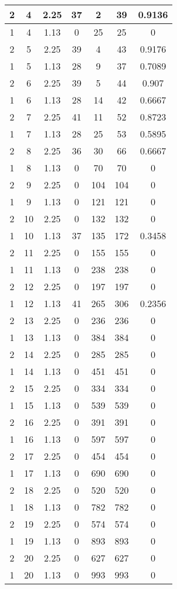 \documentclass[letterpaper, 12pt]{article}
\begin{document}
\begin{longtable}{|c|c|c|c|c|c|c|}
\hline
2 & 4 & 2.25 & 37 & 2 & 39 & 0.9136 \\
\hline
1 & 4 & 1.13 & 0 & 25 & 25 & 0 \\
\hline
2 & 5 & 2.25 & 39 & 4 & 43 & 0.9176 \\
\hline
1 & 5 & 1.13 & 28 & 9 & 37 & 0.7089 \\
\hline
2 & 6 & 2.25 & 39 & 5 & 44 & 0.907 \\
\hline
1 & 6 & 1.13 & 28 & 14 & 42 & 0.6667 \\
\hline
2 & 7 & 2.25 & 41 & 11 & 52 & 0.8723 \\
\hline
1 & 7 & 1.13 & 28 & 25 & 53 & 0.5895 \\
\hline
2 & 8 & 2.25 & 36 & 30 & 66 & 0.6667 \\
\hline
1 & 8 & 1.13 & 0 & 70 & 70 & 0 \\
\hline
2 & 9 & 2.25 & 0 & 104 & 104 & 0 \\
\hline
1 & 9 & 1.13 & 0 & 121 & 121 & 0 \\
\hline
2 & 10 & 2.25 & 0 & 132 & 132 & 0 \\
\hline
1 & 10 & 1.13 & 37 & 135 & 172 & 0.3458 \\
\hline
2 & 11 & 2.25 & 0 & 155 & 155 & 0 \\
\hline
1 & 11 & 1.13 & 0 & 238 & 238 & 0 \\
\hline
2 & 12 & 2.25 & 0 & 197 & 197 & 0 \\
\hline
1 & 12 & 1.13 & 41 & 265 & 306 & 0.2356 \\
\hline
2 & 13 & 2.25 & 0 & 236 & 236 & 0 \\
\hline
1 & 13 & 1.13 & 0 & 384 & 384 & 0 \\
\hline
2 & 14 & 2.25 & 0 & 285 & 285 & 0 \\
\hline
1 & 14 & 1.13 & 0 & 451 & 451 & 0 \\
\hline
2 & 15 & 2.25 & 0 & 334 & 334 & 0 \\
\hline
1 & 15 & 1.13 & 0 & 539 & 539 & 0 \\
\hline
2 & 16 & 2.25 & 0 & 391 & 391 & 0 \\
\hline
1 & 16 & 1.13 & 0 & 597 & 597 & 0 \\
\hline
2 & 17 & 2.25 & 0 & 454 & 454 & 0 \\
\hline
1 & 17 & 1.13 & 0 & 690 & 690 & 0 \\
\hline
2 & 18 & 2.25 & 0 & 520 & 520 & 0 \\
\hline
1 & 18 & 1.13 & 0 & 782 & 782 & 0 \\
\hline
2 & 19 & 2.25 & 0 & 574 & 574 & 0 \\
\hline
1 & 19 & 1.13 & 0 & 893 & 893 & 0 \\
\hline
2 & 20 & 2.25 & 0 & 627 & 627 & 0 \\
\hline
1 & 20 & 1.13 & 0 & 993 & 993 & 0 \\
\hline
\end{longtable}
\end{document}
